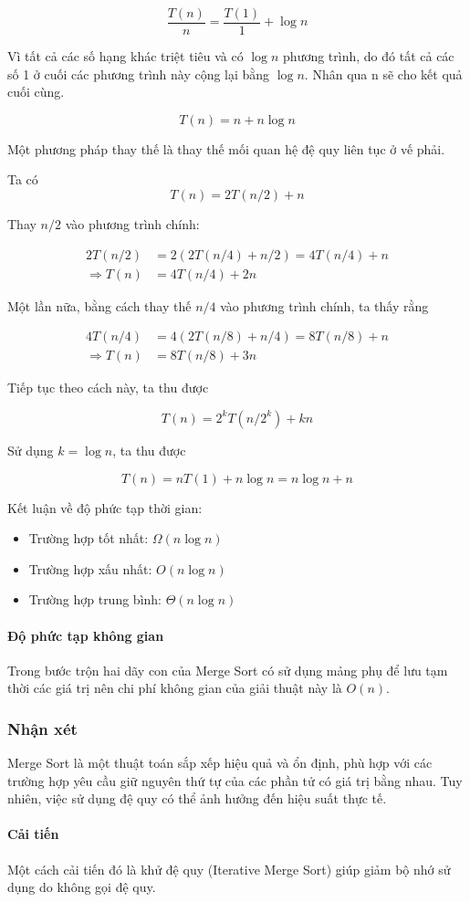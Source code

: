 $$\frac{T(n)}{n} = \frac{T(1)}{1} + \log{n}$$

Vì tất cả các số hạng khác triệt tiêu và có $\log{n}$ phương trình, do đó tất cả các số 1 ở cuối các phương trình này cộng lại bằng $\log{n}$. Nhân qua n sẽ cho kết quả cuối cùng. 

$$T(n) = n +  n\log{n}$$

Một phương pháp thay thế là thay thế mối quan hệ đệ quy liên tục ở vế phải.

Ta có 
$$T(n) = 2T(n/2) + n$$

Thay $n/2$ vào phương trình chính:

\begin{align*}
    2T(n/2) &= 2(2T(n/4) + n / 2) = 4T(n/4) + n \\
    \Rightarrow T(n) &= 4T(n / 4) + 2n
\end{align*}

Một lần nữa, bằng cách thay thế $n/4$ vào phương trình chính, ta thấy rằng 

\begin{align*}
    4T(n/4) &= 4(2T(n/8) + n / 4) = 8T(n/8) + n \\
    \Rightarrow T(n) &= 8T(n / 8) + 3n
\end{align*}

Tiếp tục theo cách này, ta thu được

$$T(n) = 2^kT(n/2^k) + kn$$


Sử dụng $k = \log{n}$, ta thu được

$$T(n) = nT(1) + n\log{n} = n\log{n} + n$$

Kết luận về độ phức tạp thời gian:

 \begin{itemize}
    \item Trường hợp tốt nhất: $\Omega(n\log{n})$ 
    \item Trường hợp xấu nhất: $O(n\log{n})$
    \item Trường hợp trung bình: $\Theta(n\log{n})$
\end{itemize}

\paragraph{Độ phức tạp không gian}
Trong bước trộn hai dãy con của Merge Sort có sử dụng mảng phụ để lưu tạm thời các giá trị nên chi phí không gian của giải thuật này là $O(n)$.

\subsubsection{Nhận xét}

Merge Sort là một thuật toán sắp xếp hiệu quả và ổn định, phù hợp với các trường hợp yêu cầu giữ nguyên thứ tự của các phần tử có giá trị bằng nhau. Tuy nhiên, việc sử dụng đệ quy có thể ảnh hưởng đến hiệu suất thực tế. 
\paragraph{Cải tiến}
Một cách cải tiến đó là khử đệ quy (Iterative Merge Sort) giúp  giảm bộ nhớ sử dụng do không gọi đệ quy.
